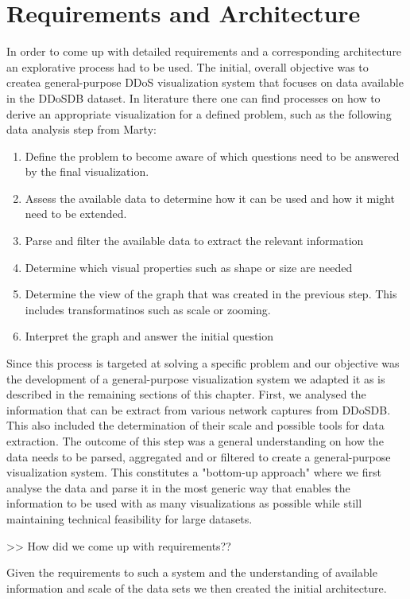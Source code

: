 
\chapter{Requirements and Architecture}
In order to come up with detailed requirements and a corresponding architecture an explorative process had to be used. The initial, overall objective was to createa general-purpose DDoS visualization system that focuses on data available in the DDoSDB dataset. In literature there one can find processes on how to derive an appropriate visualization for a defined problem, such as the following data analysis step from Marty\cite{appliedsecurityvisualization}:
\begin{enumerate}
    \item Define the problem to become aware of which questions need to be answered by the final visualization.
    \item Assess the available data to determine how it can be used and how it might need to be extended.
    \item Parse and filter the available data to extract the relevant information
    \item Determine which visual properties such as shape or size are needed
    \item Determine the view of the graph that was created in the previous step. This includes transformatinos such as scale or zooming.
    \item Interpret the graph and answer the initial question
\end{enumerate}

Since this process is targeted at solving a specific problem and our objective was the development of a general-purpose visualization system we adapted it as is described in the remaining sections of this chapter. First, we analysed the information that can be extract from various network captures from DDoSDB. This also included the determination of their scale and possible tools for data extraction. The outcome of this step was a general understanding on how the data needs to be parsed, aggregated and or filtered to create a general-purpose visualization system. This constitutes a "bottom-up approach" where we first analyse the data and parse it in the most generic way that enables the information to be used with as many visualizations as possible while still maintaining technical feasibility for large datasets.

>> How did we come up with requirements?? 

Given the requirements to such a system and the understanding of available information and scale of the data sets we then created the initial architecture.

